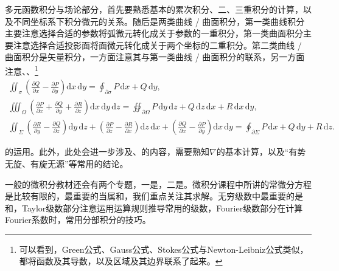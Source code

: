 多元函数积分与场论部分，首先要熟悉基本的累次积分、二、三重积分的计算，以及不同坐标系下积分微元的关系。随后是两类曲线 / 曲面积分，第一类曲线积分主要注意选择合适的参数将弧微元转化成关于参数的一重积分，第一类曲面积分主要注意选择合适投影面将面微元转化成关于两个坐标的二重积分。第二类曲线 / 曲面积分是矢量积分，一方面注意其与第一类曲线 / 曲面积分的联系，另一方面注意、、\footnote{可以看到，Green公式、Gauss公式、Stokes公式与Newton-Leibniz公式类似，都将函数及其导数，以及区域及其边界联系了起来。}
\begin{gather*}
    \iint_{\sigma} \left(\frac{\partial Q}{\partial x}-\frac{\partial P}{\partial y}\right)\mathrm{d}x\,\mathrm{d}y                                                                                                                                                                                                     = \oint_{\partial \sigma} P\,\mathrm{d}x+Q\,\mathrm{d}y,                                                        \\
    \iiint_{\Omega} \left(\frac{\partial P}{\partial x}+\frac{\partial Q}{\partial y}+\frac{\partial R}{\partial z}\right)\mathrm{d}x\,\mathrm{d}y\,\mathrm{d}z                                                                                                                                                         = \oiint_{\partial \Omega} P\,\mathrm{d}y\,\mathrm{d}z+Q\,\mathrm{d}z\,\mathrm{d}x+R\,\mathrm{d}x\,\mathrm{d}y, \\
    \iint_{\Sigma} \left(\frac{\partial R}{\partial y}-\frac{\partial Q}{\partial z}\right)\mathrm{d}y\,\mathrm{d}z+\left(\frac{\partial P}{\partial z}-\frac{\partial R}{\partial x}\right)\mathrm{d}z\,\mathrm{d}x  +\left(\frac{\partial Q}{\partial x}-\frac{\partial P}{\partial y}\right)\mathrm{d}x\,\mathrm{d}y = \oint_{\partial \Sigma} P\,\mathrm{d}x+Q\,\mathrm{d}y+R\,\mathrm{d}z.
\end{gather*}

的运用。此外，此处会进一步涉及、的内容，需要熟知\;$\nabla$的基本计算，以及“有势无旋、有旋无源”等常用的结论。

一般的微积分教材还会有两个专题，一是，二是。微积分课程中所讲的常微分方程是比较有限的，最重要的当属和，我们重点关注其求解。无穷级数中最重要的是和，Taylor级数部分注意运用运算规则推导常用的级数，Fourier级数部分在计算Fourier系数时，常用分部积分的技巧。

